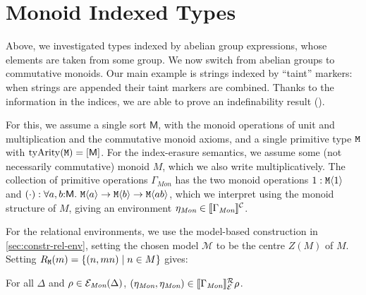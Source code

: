 \section{Monoid Indexed Types}
\label{sec:monoid-indexed-types}

\newcommand{\Mon}{\textit{Mon}}

Above, we investigated types indexed by abelian group expressions,
whose elements are taken from some group. We now switch from abelian
groups to commutative monoids.  Our main example is strings indexed by
``taint'' markers: when strings are appended their taint markers are
combined. Thanks to the information in the indices, we are able to
prove an indefinability result ().

For this, we assume a single sort $\mathsf{M}$, with the monoid operations of
unit and multiplication and the commutative monoid axioms, and a %
single primitive type $\textup{\texttt{M}}$ with $\mathrm{tyArity}(\textup{\texttt{M}})
= [\mathsf{M}]$. For the index-erasure semantics, we assume some (not
necessarily commutative) monoid $M$, which we 
also write
multiplicatively. The collection of primitive operations
$\Gamma_{\mathit{Mon}}$ %
has the two monoid operations
$1 : \textup{\texttt{M}}\langle 1 \rangle$ and $(\cdot) : \forall
a,b\mathord:\mathsf{M}.\ \textup{\texttt{M}}\langle a \rangle \to \textup{\texttt{M}}\langle b \rangle \to
\textup{\texttt{M}}\langle a b \rangle$, which we interpret using the monoid structure of
$M$, giving an environment $\eta_\Mon \in \ctxtSem{\Gamma_\Mon}$.

For the relational environments, we use %
the model-based
construction in \autoref{sec:constr-rel-env}, setting the chosen model
$\mathcal{M}$ to be the centre $Z(M)$ of $M$. %
Setting $R_{\textup{\texttt{M}}}(m) = \{ (n,mn) \mathrel| n
\in M \}$
gives:
\begin{lemma}\label{lem:monoid-ops-related}
  For all $\Delta$ and $\rho \in \relEnv{E}_\Mon(\Delta)$,
  $(\eta_\Mon,\eta_\Mon) \in \rsem{\Gamma_\Mon}{\relEnv{E}}\rho$.
\end{lemma}

